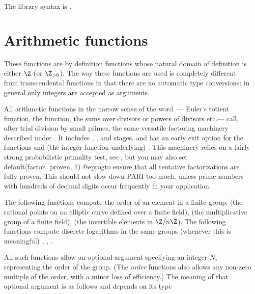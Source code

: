 The library syntax is .

\section{Arithmetic functions}\label{se:arithmetic}

These functions are by definition functions whose natural domain of
definition is either $\Z$ (or $\Z_{>0}$). The way these functions are used is
completely different from transcendental functions in that there are no
automatic type conversions: in general only integers are accepted as
arguments.

All arithmetic functions in the narrow sense of the word~--- Euler's
totient function, the  function,
the sums over divisors or powers of divisors etc.--- call, after trial
division by small primes, the same versatile factoring machinery described
under . It includes , ,
 and  stages, and has an early exit option for the
functions  and (the integer function underlying)
. This machinery relies on a fairly strong
probabilistic primality test, see , but you may also set
\bprog
  default(factor_proven, 1)
@eprog\noindent to ensure that all tentative factorizations are fully proven.
This should not slow down PARI too much, unless prime numbers with
hundreds of decimal digits occur frequently in your application.

\label{se:DLfun}

The following functions compute the order of an element in a finite group:
 (the rational points on an elliptic curve defined over a
finite field),  (the multiplicative group of a finite field),
 (the invertible elements in $\Z/n\Z$). The following functions
compute discrete logarithms in the same groups (whenever this is meaningful)
, , .

All such functions allow an optional argument specifying an integer
$N$, representing the order of the group. (The \emph{order} functions also
allows any non-zero multiple of the order, with a minor loss of efficiency.)
The meaning of that optional argument is as follows and depends on its type

